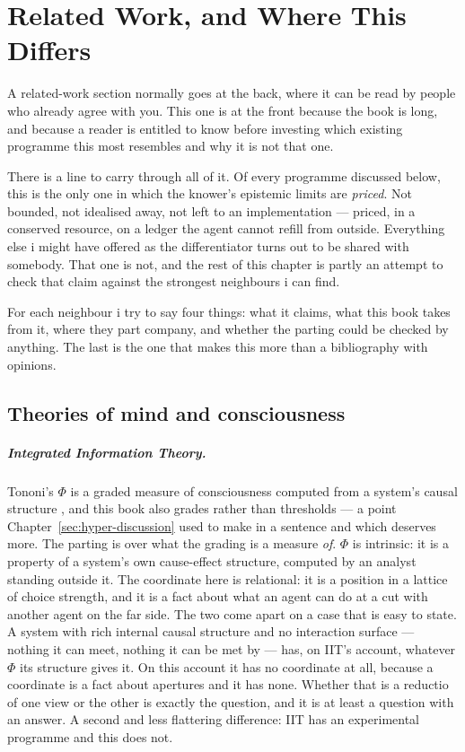 \chapter*{Related Work, and Where This Differs}
\label{ch:related}
\renewcommand{\thetable}{\Alph{table}}\setcounter{table}{0}

A related-work section normally goes at the back, where it can be
read by people who already agree with you.
This one is at the front because the book is long, and because a
reader is entitled to know before investing which existing
programme this most resembles and why it is not that one.

There is a line to carry through all of it.
Of every programme discussed below, this is the only one in which
the knower's epistemic limits are \emph{priced}.
Not bounded, not idealised away, not left to an implementation ---
priced, in a conserved resource, on a ledger the agent cannot
refill from outside.
Everything else i might have offered as the differentiator turns
out to be shared with somebody.
That one is not, and the rest of this chapter is partly an attempt
to check that claim against the strongest neighbours i can find.

For each neighbour i try to say four things: what it claims, what
this book takes from it, where they part company, and whether the
parting could be checked by anything.
The last is the one that makes this more than a bibliography with
opinions.

\section*{Theories of mind and consciousness}

\paragraph{Integrated Information Theory.}
Tononi's $\Phi$ is a graded measure of consciousness computed from
a system's causal structure \cite{tononi2008consciousness}, and
this book also grades rather than thresholds --- a point
Chapter~\ref{sec:hyper-discussion} used to make in a sentence and
which deserves more.
The parting is over what the grading is a measure \emph{of}.
$\Phi$ is intrinsic: it is a property of a system's own cause-effect
structure, computed by an analyst standing outside it.
The coordinate here is relational: it is a position in a lattice of
choice strength, and it is a fact about what an agent can do at a
cut with another agent on the far side.
The two come apart on a case that is easy to state.
A system with rich internal causal structure and no interaction
surface --- nothing it can meet, nothing it can be met by --- has,
on IIT's account, whatever $\Phi$ its structure gives it.
On this account it has no coordinate at all, because a coordinate
is a fact about apertures and it has none.
Whether that is a reductio of one view or the other is exactly the
question, and it is at least a question with an answer.
A second and less flattering difference: IIT has an experimental
programme and this does not.

